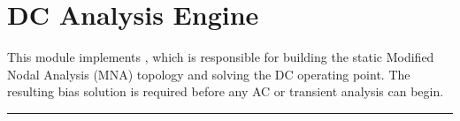 \documentclass[letterpaper,10pt,english]{sphinxmanual}
\begin{document}
\sphinxstepscope


\chapter{DC Analysis Engine}
\label{\detokenize{dc_engine:dc-analysis-engine}}\label{\detokenize{dc_engine:dc-engine-module}}\label{\detokenize{dc_engine::doc}}
\sphinxAtStartPar
This module implements {\hyperref[\detokenize{dc_engine:DCEngine}]{}}, which is responsible for building the static
Modified Nodal Analysis (MNA) topology and solving the DC operating point.
The resulting bias solution is required before any AC or transient analysis can begin.


\bigskip\hrule\bigskip

\end{document}
